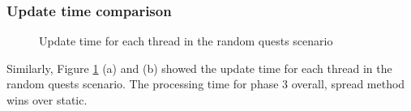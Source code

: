 \documentclass[12pt,a4paper]{article} %
\theoremstyle{definition}
\theoremstyle{remark}
\begin{document}
\subsubsection {Update time comparison} 
	\begin{figure}[!ht]
		\hfill
		\caption{Update time for each thread in the random quests scenario}
		\label{update_time_random}
	\end{figure}
Similarly, Figure \ref{update_time_random} (a) and (b) showed the update time for each thread in the random quests scenario. The processing time for phase 3 overall, spread method wins over static.
\end{document}
